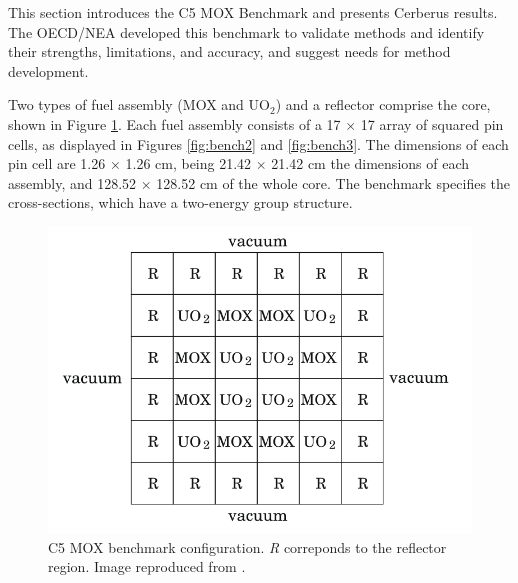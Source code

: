 \documentclass{anstrans}
\begin{document}
This section introduces the C5 MOX Benchmark \cite{cavarec_benchmark_1994} and presents Cerberus results.
The \gls{OECD}/\gls{NEA} developed this benchmark to validate methods and identify their strengths, limitations, and accuracy, and suggest needs for method development.



Two types of fuel assembly (MOX and UO$_2$) and a reflector comprise the core, shown in Figure \ref{fig:bench1}.
Each fuel assembly consists of a 17 $\times$ 17 array of squared pin cells, as displayed in Figures \ref{fig:bench2} and \ref{fig:bench3}.
The dimensions of each pin cell are 1.26 $\times$ 1.26 cm, being 21.42 $\times$ 21.42 cm the dimensions of each assembly, and 128.52 $\times$ 128.52 cm of the whole core.
The benchmark \cite{cavarec_benchmark_1994} specifies the cross-sections, which have a two-energy group structure.

\begin{figure}[htbp!] %
    \centering
    \includegraphics[width=0.85\linewidth]{figures/bench-config.png}
    \hfill
    \caption{C5 MOX benchmark configuration. \textit{R} correponds to the reflector region. Image reproduced from \cite{capilla_applications_2009}.}
    \label{fig:bench1}
\end{figure}
\end{document}
